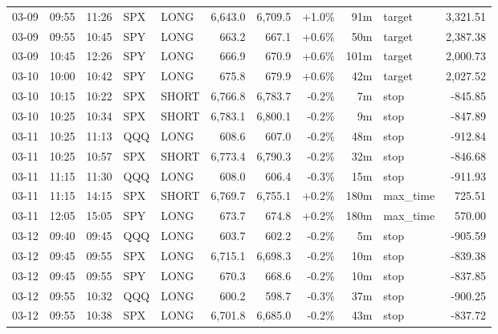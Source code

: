 \documentclass[11pt,a4paper,twoside]{article}
\begin{document}
\begin{center}
\begin{longtable}{>{\color{txtmain}}l l l l l r r r r >{\color{txtmain}}l r}
03-09 & 09:55 & 11:26 & SPX & LONG & 6,643.0 & 6,709.5 & \textcolor{wingreen}{+1.0\%} & 91m & target & \textcolor{wingreen}{3,321.51} \\
03-09 & 09:55 & 10:45 & SPY & LONG & 663.2 & 667.1 & \textcolor{wingreen}{+0.6\%} & 50m & target & \textcolor{wingreen}{2,387.38} \\
03-09 & 10:45 & 12:26 & SPY & LONG & 666.9 & 670.9 & \textcolor{wingreen}{+0.6\%} & 101m & target & \textcolor{wingreen}{2,000.73} \\
03-10 & 10:00 & 10:42 & SPY & LONG & 675.8 & 679.9 & \textcolor{wingreen}{+0.6\%} & 42m & target & \textcolor{wingreen}{2,027.52} \\
03-10 & 10:15 & 10:22 & SPX & SHORT & 6,766.8 & 6,783.7 & \textcolor{lossred}{-0.2\%} & 7m & stop & \textcolor{lossred}{-845.85} \\
03-10 & 10:25 & 10:34 & SPX & SHORT & 6,783.1 & 6,800.1 & \textcolor{lossred}{-0.2\%} & 9m & stop & \textcolor{lossred}{-847.89} \\
03-11 & 10:25 & 11:13 & QQQ & LONG & 608.6 & 607.0 & \textcolor{lossred}{-0.2\%} & 48m & stop & \textcolor{lossred}{-912.84} \\
03-11 & 10:25 & 10:57 & SPX & SHORT & 6,773.4 & 6,790.3 & \textcolor{lossred}{-0.2\%} & 32m & stop & \textcolor{lossred}{-846.68} \\
03-11 & 11:15 & 11:30 & QQQ & LONG & 608.0 & 606.4 & \textcolor{lossred}{-0.3\%} & 15m & stop & \textcolor{lossred}{-911.93} \\
03-11 & 11:15 & 14:15 & SPX & SHORT & 6,769.7 & 6,755.1 & \textcolor{wingreen}{+0.2\%} & 180m & max\_time & \textcolor{wingreen}{725.51} \\
03-11 & 12:05 & 15:05 & SPY & LONG & 673.7 & 674.8 & \textcolor{wingreen}{+0.2\%} & 180m & max\_time & \textcolor{wingreen}{570.00} \\
03-12 & 09:40 & 09:45 & QQQ & LONG & 603.7 & 602.2 & \textcolor{lossred}{-0.2\%} & 5m & stop & \textcolor{lossred}{-905.59} \\
03-12 & 09:45 & 09:55 & SPX & LONG & 6,715.1 & 6,698.3 & \textcolor{lossred}{-0.2\%} & 10m & stop & \textcolor{lossred}{-839.38} \\
03-12 & 09:45 & 09:55 & SPY & LONG & 670.3 & 668.6 & \textcolor{lossred}{-0.2\%} & 10m & stop & \textcolor{lossred}{-837.85} \\
03-12 & 09:55 & 10:32 & QQQ & LONG & 600.2 & 598.7 & \textcolor{lossred}{-0.3\%} & 37m & stop & \textcolor{lossred}{-900.25} \\
03-12 & 09:55 & 10:38 & SPX & LONG & 6,701.8 & 6,685.0 & \textcolor{lossred}{-0.2\%} & 43m & stop & \textcolor{lossred}{-837.72} \\

\end{longtable}
\end{center}
\end{document}
